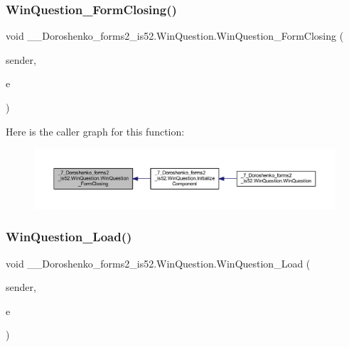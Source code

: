 \subsubsection{\texorpdfstring{Win\+Question\+\_\+\+Form\+Closing()}{WinQuestion\_FormClosing()}}
{\footnotesize\ttfamily void \+\_\+\_\+\+Doroshenko\+\_\+forms2\+\_\+is52.\+Win\+Question.\+Win\+Question\+\_\+\+Form\+Closing (\begin{DoxyParamCaption}\item[{object}]{sender,  }\item[{Form\+Closing\+Event\+Args}]{e }\end{DoxyParamCaption})\hspace{0.3cm}{\ttfamily [private]}}

Here is the caller graph for this function\+:
\nopagebreak
\begin{figure}[H]
\begin{center}
\leavevmode
\includegraphics[width=350pt]{class__7___doroshenko__forms2__is52_1_1_win_question_ace95f250fa359610e86f5fedd278e67e_icgraph}
\end{center}
\end{figure}
\hypertarget{class__7___doroshenko__forms2__is52_1_1_win_question_a5d411864ac52b7998aba29e9adb8f902}{}\label{class__7___doroshenko__forms2__is52_1_1_win_question_a5d411864ac52b7998aba29e9adb8f902} 
\subsubsection{\texorpdfstring{Win\+Question\+\_\+\+Load()}{WinQuestion\_Load()}}
{\footnotesize\ttfamily void \+\_\+\_\+\+Doroshenko\+\_\+forms2\+\_\+is52.\+Win\+Question.\+Win\+Question\+\_\+\+Load (\begin{DoxyParamCaption}\item[{object}]{sender,  }\item[{Event\+Args}]{e }\end{DoxyParamCaption})\hspace{0.3cm}{\ttfamily [private]}}

